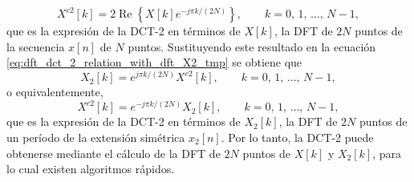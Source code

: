 \documentclass[a4paper]{report}
\renewcommand{\Re}{\operatorname{Re}}
\begin{document}
\begin{equation}\label{eq:dft_dct_2_relation_with_dft_X}
 X^{c2}[k]=2\Re\left\{X[k]e^{-j\pi k/(2N)}\right\},
 \qquad 
 k=0,\,1,\,\dots,\,N-1,
\end{equation}
que es la expresión de la DCT-2 en términos de \(X[k]\), la DFT de \(2N\) puntos de la secuencia \(x[n]\) de \(N\) puntos. Sustituyendo este resultado en la ecuación \ref{eq:dft_dct_2_relation_with_dft_X2_tmp} se obtiene que 
\begin{equation}\label{eq:dft_dct_2_relation_with_dft_X2_alt}
 X_2[k]=e^{j\pi k/(2N)}X^{c2}[k],
 \qquad 
 k=0,\,1,\,\dots,\,N-1,
\end{equation}
o equivalentemente,
\begin{equation}\label{eq:dft_dct_2_relation_with_dft_X2}
 X^{c2}[k]=e^{-j\pi k/(2N)}X_2[k],
 \qquad 
 k=0,\,1,\,\dots,\,N-1,
\end{equation}
que es la expresión de la DCT-2 en términos de \(X_2[k]\), la DFT de \(2N\) puntos de un período de la extensión simétrica \(x_2[n]\).
Por lo tanto, la DCT-2 puede obtenerse mediante el cálculo de la DFT de \(2N\) puntos de \(X[k]\) y \(X_2[k]\), para lo cual existen algoritmos rápidos.
\end{document}
